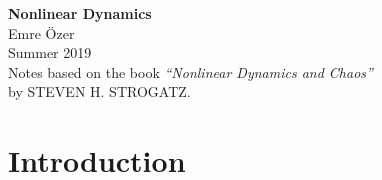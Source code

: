 \documentclass[oneside]{book}
\begin{document}
\begin{titlepage}
\vspace*{\fill}
\begin{center}
{\Huge{\textbf{Nonlinear Dynamics}}}\\[2cm]
{\Large{Emre Özer}\\[0.4cm]}
Summer 2019 \\
\vspace{4mm}
      Notes based on the book \textit{``Nonlinear Dynamics and Chaos''} \\by STEVEN H. STROGATZ. 
\end{center}
\vspace*{\fill}
\end{titlepage}

\tableofcontents

\chapter{Introduction}
\end{document}
